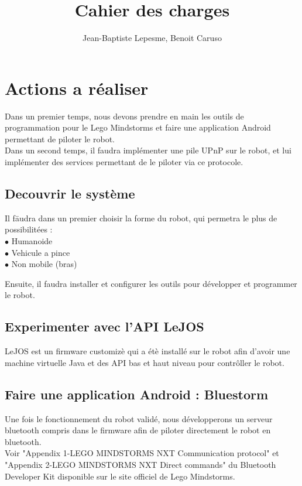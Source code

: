 \documentclass[10pt,a4paper]{article}
\title{Cahier des charges}
\author{Jean-Baptiste Lepesme, Benoit Caruso}
\begin{document}
	
	\maketitle%
	\tableofcontents%
	\newpage%
	
	\section{Actions a r\'ealiser}
		Dans un premier temps, nous devons prendre en main les outils de programmation pour le Lego Mindstorms et faire une application Android permettant de piloter le robot.\\
		Dans un second temps, il faudra implémenter une pile UPnP sur le robot, et lui implémenter des services permettant de le piloter via ce protocole.
		\subsection{Decouvrir le syst\`eme}
			\begin{tabbing}
			Il f\=audra dans un premier choisir la forme du robot, qui permetra le plus de possibilitées :\\
			\>	$ \bullet $ Humanoide\\
			\>	$ \bullet $ Vehicule a pince\\
			\>	$ \bullet $ Non mobile (bras)\\
			\end{tabbing}
			Ensuite, il faudra installer et configurer les outils pour développer et programmer le robot.
			
		\subsection{Experimenter avec l'API LeJOS}
			LeJOS est un firmware customiz\`e qui a \'et\`e install\'e sur le robot afin d'avoir une machine virtuelle Java et des API bas et haut niveau pour contr\^oller le robot.
		\subsection{Faire une application Android : Bluestorm}
			Une fois le fonctionnement du robot validé, nous développerons un serveur bluetooth compris dans le firmware afin de piloter directement le robot en bluetooth.\\%
			Voir "Appendix 1-LEGO MINDSTORMS NXT Communication protocol" et "Appendix 2-LEGO MINDSTORMS NXT Direct commands" du Bluetooth Developer Kit disponible sur le site officiel de Lego Mindstorms.\\
\end{document}
